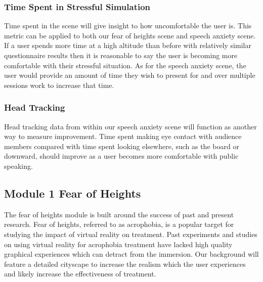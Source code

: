 \documentclass[a4paper,10pt]{article}
\begin{document}
\subsubsection{Time Spent in Stressful Simulation}
Time spent in the scene will give insight to how uncomfortable the user is. This metric can be applied to both our fear of heights scene and speech anxiety scene. 
If a user spends more time at a high altitude than before with relatively similar questionnaire results then it is reasonable to say the user is becoming more comfortable
with their stressful situation. As for the speech anxiety scene, the user would provide an amount of time they wish to present for and over multiple sessions work to increase that time.

\subsubsection{Head Tracking}
Head tracking data from within our speech anxiety scene will function as another way to measure improvement. 
Time spent making eye contact with audience members compared with time spent looking elsewhere, such as the board or downward, should improve as a user becomes more comfortable with public speaking.

\pagebreak
\subsection{Module 1 Fear of Heights}
The fear of heights module is built around the success of past and present research. Fear of heights, referred to as acrophobia, is a popular target for studying the impact of virtual reality on treatment. Past experiments and studies on using virtual reality for acrophobia treatment have lacked high quality graphical experiences which can detract from the immersion. Our background will feature a detailed cityscape to increase the realism which the user experiences and likely increase the effectiveness of treatment.
\end{document}
